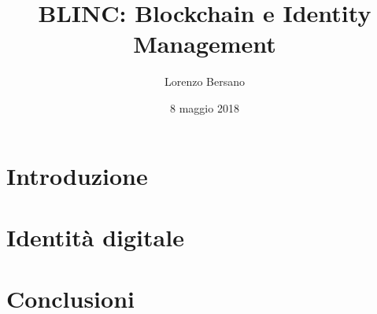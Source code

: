 \documentclass[11pt, a4paper, twoside, openright]{book}
\title{BLINC: Blockchain e Identity Management}
\author{Lorenzo Bersano}
\date{8 maggio 2018}
\begin{document}
\maketitle

\chapter{Introduzione}

\chapter{Identit\`a digitale}

\chapter{Conclusioni}
\end{document}

